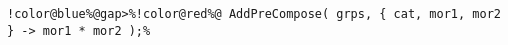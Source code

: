 \begin{Verbatim}[commandchars=!@\%,frame=single]
!color@blue%@gap>%!color@red%@ AddPreCompose( grps, { cat, mor1, mor2 } -> mor1 * mor2 );%
\end{Verbatim}

